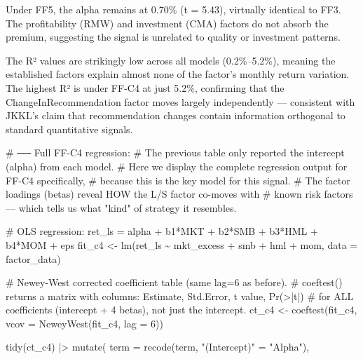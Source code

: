 \documentclass[
  letterpaper,
  DIV=11,
  numbers=noendperiod]{scrartcl}
\newenvironment{Shaded}{\begin{snugshade}}{\end{snugshade}}
\newcommand{\AttributeTok}[1]{\textcolor[rgb]{0.40,0.45,0.13}{#1}}
\newcommand{\CommentTok}[1]{\textcolor[rgb]{0.37,0.37,0.37}{#1}}
\newcommand{\DecValTok}[1]{\textcolor[rgb]{0.68,0.00,0.00}{#1}}
\newcommand{\FunctionTok}[1]{\textcolor[rgb]{0.28,0.35,0.67}{#1}}
\newcommand{\NormalTok}[1]{\textcolor[rgb]{0.00,0.23,0.31}{#1}}
\newcommand{\OtherTok}[1]{\textcolor[rgb]{0.00,0.23,0.31}{#1}}
\newcommand{\SpecialCharTok}[1]{\textcolor[rgb]{0.37,0.37,0.37}{#1}}
\newcommand{\StringTok}[1]{\textcolor[rgb]{0.13,0.47,0.30}{#1}}
\begin{document}
Under FF5, the alpha remains at 0.70\% (t = 5.43), virtually identical
to FF3. The profitability (RMW) and investment (CMA) factors do not
absorb the premium, suggesting the signal is unrelated to quality or
investment patterns.

The R² values are strikingly low across all models (0.2\%--5.2\%),
meaning the established factors explain almost none of the factor's
monthly return variation. The highest R² is under FF-C4 at just 5.2\%,
confirming that the ChangeInRecommendation factor moves largely
independently --- consistent with JKKL's claim that recommendation
changes contain information orthogonal to standard quantitative signals.

\begin{Shaded}
\begin{Highlighting}[]
\CommentTok{\# ── Full FF{-}C4 regression:}
\CommentTok{\# The previous table only reported the intercept (alpha) from each model.}
\CommentTok{\# Here we display the complete regression output for FF{-}C4 specifically,}
\CommentTok{\# because this is the key model for this signal.}
\CommentTok{\# The factor loadings (betas) reveal HOW the L/S factor co{-}moves with}
\CommentTok{\# known risk factors — which tells us what "kind" of strategy it resembles.}

\CommentTok{\# OLS regression: ret\_ls = alpha + b1*MKT + b2*SMB + b3*HML + b4*MOM + eps}
\NormalTok{fit\_c4 }\OtherTok{\textless{}{-}} \FunctionTok{lm}\NormalTok{(ret\_ls }\SpecialCharTok{\textasciitilde{}}\NormalTok{ mkt\_excess }\SpecialCharTok{+}\NormalTok{ smb }\SpecialCharTok{+}\NormalTok{ hml }\SpecialCharTok{+}\NormalTok{ mom, }\AttributeTok{data =}\NormalTok{ factor\_data)}

\CommentTok{\# Newey{-}West corrected coefficient table (same lag=6 as before).}
\CommentTok{\# coeftest() returns a matrix with columns: Estimate, Std.Error, t value, Pr(\textgreater{}|t|)}
\CommentTok{\# for ALL coefficients (intercept + 4 betas), not just the intercept.}
\NormalTok{ct\_c4 }\OtherTok{\textless{}{-}} \FunctionTok{coeftest}\NormalTok{(fit\_c4, }\AttributeTok{vcov =} \FunctionTok{NeweyWest}\NormalTok{(fit\_c4, }\AttributeTok{lag =} \DecValTok{6}\NormalTok{))}

\FunctionTok{tidy}\NormalTok{(ct\_c4) }\SpecialCharTok{|\textgreater{}}
  \FunctionTok{mutate}\NormalTok{(}
    \AttributeTok{term =} \FunctionTok{recode}\NormalTok{(term, }\StringTok{"(Intercept)"} \OtherTok{=} \StringTok{"Alpha"}\NormalTok{),}
    

\end{Highlighting}
\end{Shaded}
\end{document}
